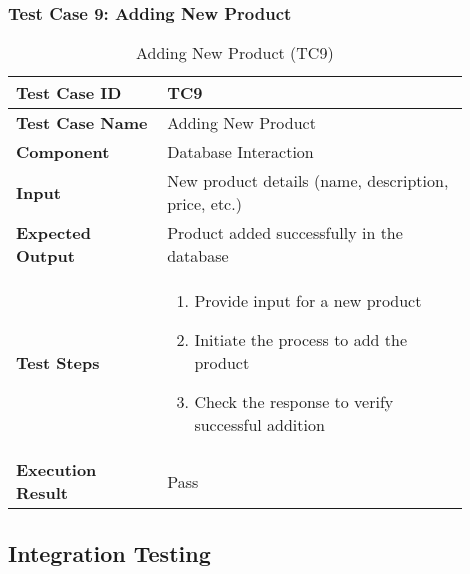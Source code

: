 \begin{table}[h]
	\subsubsection{Test Case 9: Adding New Product}
	\centering
	\caption{Adding New Product (TC9)}
	\begin{tabular}{|p{0.3\linewidth}|p{0.6\linewidth}|}
		\hline
		\textbf{Test Case ID} & TC9 \\
		\hline
		\textbf{Test Case Name} & Adding New Product \\
		\hline
		\textbf{Component} & Database Interaction \\
		\hline
		\textbf{Input} & New product details (name, description, price, etc.) \\
		\hline
		\textbf{Expected Output} & Product added successfully in the database \\
		\hline
		\textbf{Test Steps} & \begin{enumerate}
			\item Provide input for a new product 
			\item Initiate the process to add the product
			\item Check the response to verify successful addition
			\end{enumerate} \\
		\hline
		\textbf{Execution Result} & Pass \\
		\hline
	\end{tabular}
\end{table}

\pagebreak
\subsection{Integration Testing}

